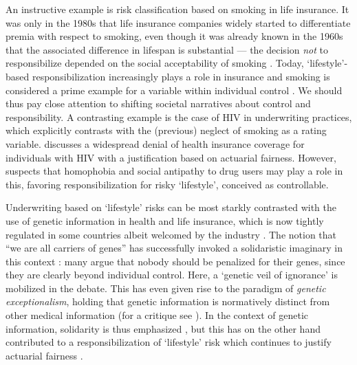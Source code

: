\documentclass[11pt]{article} %
\begin{document}
An instructive example is risk classification based on smoking in life insurance. It was only in the 1980s that life insurance companies widely started to differentiate premia with respect to smoking, even though it was already known in the 1960s that the associated difference in lifespan is substantial --- the decision \textit{not} to responsibilize depended on the social acceptability of smoking \citep{wilkie1997mutuality,glenn2003risk}. Today, `lifestyle'-based responsibilization increasingly plays a role in insurance and smoking is considered a prime example for a variable within individual control \citep{van2006making,van2007genetic}. We should thus pay close attention to shifting societal narratives about control and responsibility.
A contrasting example is the case of HIV in underwriting practices, which \citet{daniels1990insurability} explicitly contrasts with the (previous) neglect of smoking as a rating variable. \citet{daniels1990insurability} discusses a widespread denial of health insurance coverage for individuals with HIV with a justification based on actuarial fairness. However, \citet{daniels1990insurability} suspects that homophobia and social antipathy to drug users may play a role in this, favoring responsibilization for risky `lifestyle', conceived as controllable.

Underwriting based on `lifestyle' risks can be most starkly contrasted with the use of genetic information in health and life insurance, which is now tightly regulated in some countries \citep{van2018genomics} albeit welcomed by the industry \citep{rechfeld2016personalised}. The notion that ``we are all carriers of genes'' has successfully invoked a solidaristic imaginary in this context \citep{van2007genetic}: many argue that nobody should be penalized for their genes, since they are clearly beyond individual control. Here, a `genetic veil of ignorance' is mobilized in the debate. This has even given rise to the paradigm of \textit{genetic exceptionalism}, holding that genetic information is normatively distinct from other medical information (for a critique see \citep{lippert2015genetic}). In the context of genetic information, solidarity is thus emphasized \citep{liukko2010genetic}, but this has on the other hand contributed to a responsibilization of `lifestyle' risk which continues to justify actuarial fairness \citep{van2018genomics}. 
\end{document}
